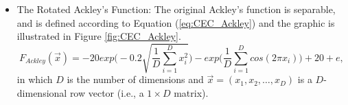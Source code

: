 \begin{itemize}
  \item The Rotated Ackley's Function: The original Ackley's function is separable, and is defined according to Equation (\ref{eq:CEC_Ackley}) and the graphic is illustrated in Figure \ref{fig:CEC_Ackley}.
      \begin{equation}\label{eq:CEC_Ackley}
      F_{Ackley}(\vec{x}) = -20exp\Biggl(-0.2\sqrt{\frac{1}{D}\sum_{i=1}^{D}x_i^2}\Biggr) - exp\Biggl(\frac{1}{D}\sum_{i=1}^{D}cos(2 \pi x_i)\Biggr) + 20 + e,
      \end{equation}
      in which $D$ is the number of dimensions and $\vec{x} = (x_1, x_2, \ldots, x_D)$ is a $D$-dimensional row vector (i.e., a $1 \times D$ matrix).
      \begin{figure}[!h]
      \centering
      \hspace{1mm}

\end{figure}
\end{itemize}
